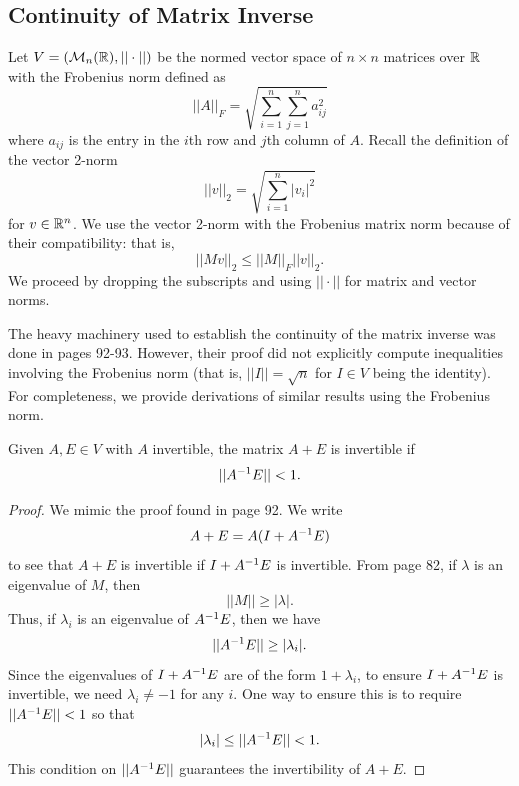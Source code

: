 \documentclass[letterpaper,titlepage]{article}
\begin{document}
\subsection{Continuity of Matrix Inverse} \label{continuity_of_inverse} %
Let $V=(\mathcal{M}_n(\mathbb{R}), ||\cdot||)$ be the normed vector space of $n\times n$ matrices over $\mathbb{R}$ with the Frobenius norm defined as
$$||A||_F = \sqrt{\sum_{i=1}^n\sum_{j=1}^na_{ij}^2}$$
where $a_{ij}$ is the entry in the $i$th row and $j$th column of $A$. Recall the definition of the vector 2-norm
$$||v||_2 = \sqrt{\sum_{i=1}^n |v_i|^2}$$
for $v \in \mathbb{R}^n$. We use the vector 2-norm with the Frobenius matrix norm because of their compatibility: that is, 
$$||Mv||_2 \leq||M||_F||v||_2.$$
We proceed by dropping the subscripts and using $||\cdot||$ for matrix and vector norms.

The heavy machinery used to establish the continuity of the matrix inverse was done in \cite{Wilkinson} pages 92-93. However, their proof did not explicitly compute inequalities involving the Frobenius norm (that is, $||I|| = \sqrt{n}$ for $I \in V$ being the identity). For completeness, we provide derivations of similar results using the Frobenius norm.

\begin{lem}\label{lem:AplusE_invertible}
    Given $A,E \in V$ with $A$ invertible, the matrix $A+E$ is invertible if
    $$||A^{-1} E|| < 1.$$
\end{lem}
\begin{proof}
    We mimic the proof found in \cite{Wilkinson} page 92. We write
    \begin{equation}\label{eqn:rewrite_AplusE}
        A+E = A(I+A^{-1} E)
    \end{equation}
    to see that $A+E$ is invertible if $I+A^{-1} E$ is invertible. From \cite{Wilkinson} page 82, if $\lambda$ is an eigenvalue of $M$, then
    $$||M||\geq|\lambda|.$$
    Thus, if $\lambda_i$ is an eigenvalue of $A^{-1} E$, then we have
    $$||A^{-1} E|| \geq |\lambda_i|.$$
    Since the eigenvalues of $I+A^{-1} E$ are of the form $1+\lambda_i$, to ensure $I+A^{-1} E$ is invertible, we need $\lambda_i \neq -1$ for any $i$. One way to ensure this is to require $||A^{-1} E||<1$ so that
    $$|\lambda_i|\leq||A^{-1} E||< 1.$$
    This condition on $||A^{-1} E||$ guarantees the invertibility of $A+E$.
\end{proof}
\end{document}

